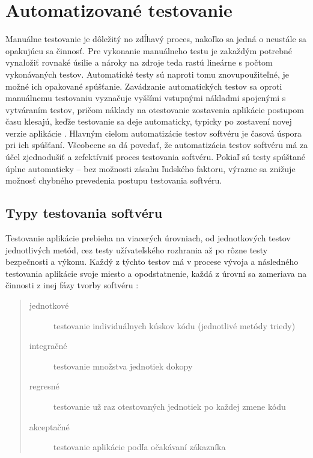 \section{Automatizované testovanie}
Manuálne testovanie je dôležitý no zdĺhavý proces, nakoľko sa jedná o neustále sa opakujúcu sa činnosť. Pre vykonanie manuálneho testu je zakaždým potrebné vynaložiť rovnaké úsilie a nároky na zdroje teda rastú lineárne s počtom vykonávaných testov. Automatické testy sú naproti tomu znovupoužiteľné, je možné ich opakované spúšťanie. Zavádzanie automatických testov sa oproti manuálnemu testovaniu vyznačuje vyššími vstupnými nákladmi spojenými s vytváraním testov, pričom náklady na otestovanie zostavenia aplikácie postupom času klesajú, keďže testovanie sa deje automaticky, typicky po zostavení novej verzie aplikácie \cite{test-automation,thesis-automation-testing}. Hlavným cielom automatizácie testov softvéru je časová úspora pri ich spúšťaní. Všeobecne sa dá povedať, že automatizácia testov softvéru má za účel zjednodušiť a zefektívniť proces testovania softvéru. Pokiaľ sú testy spúštané úplne automaticky -- bez možnosti zásahu ľudského faktoru, výrazne sa znižuje možnosť chybného prevedenia postupu testovania softvéru.

\subsection{Typy testovania softvéru}
Testovanie aplikácie prebieha na viacerých úrovniach, od jednotkových testov jednotlivých metód, cez testy užívateľského rozhrania až po rôzne testy
bezpečnosti a výkonu. Každý z týchto testov má v procese vývoja a následného testovania aplikácie svoje miesto a opodstatnenie, každá z úrovní sa zameriava na činnosti z inej fázy tvorby softvéru \cite{general-testing}:
\begin{quote}
\begin{description}
\item[jednotkové] testovanie individuálnych kúskov kódu (jednotlivé metódy triedy)
\item[integračné] testovanie množstva jednotiek dokopy
\item[regresné]   testovanie už raz otestovaných jednotiek po každej zmene kódu
\item[akceptačné] testovanie aplikácie podľa očakávaní zákazníka
\end{description}
\end{quote}

